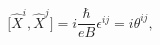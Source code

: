 \begin{equation}
\lbrack\widehat{X}^{i},\widehat{X}^{j}]=i\frac{\hbar}{eB}\epsilon^{ij}%
=i\theta^{ij},\label{2.9}%
\end{equation}

